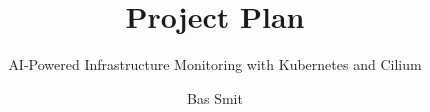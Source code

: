 \documentclass{tudelft-report}
\begin{document}
\frontmatter

\title{Project Plan}
\subtitle{AI-Powered Infrastructure Monitoring with Kubernetes and Cilium}
\author{Bas Smit}

\subject{Research}

\makecover

\tableofcontents

\mainmatter






\end{document}
